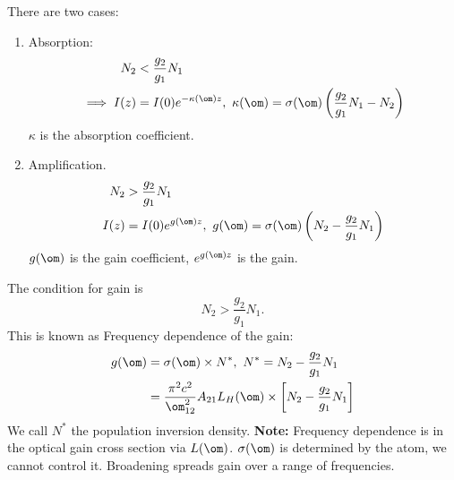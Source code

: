 \documentclass[a4paper, 11pt, normalem]{report}
\begin{document}
There are two cases:
\begin{enumerate}
    \item Absorption:
        \begin{align}
            N_2 &< \frac{g_2}{g_1}N_1 \\
            \implies I(z) &= I(0)e^{-\kappa(\om)z},~ \kappa(\om) = \sigma(\om)\left(\frac{g_2}{g_1}N_1 - N_2\right)
        \end{align}
        $\kappa$ is the absorption coefficient.
        \begin{figure}[H]
            \centering
        \end{figure}
    \item Amplification.
        \begin{align}
            N_2 &> \frac{g_2}{g_1}N_1 \\
            I(z) &= I(0)e^{g(\om)z},~ g(\om) = \sigma(\om)\left(N_2-\frac{g_2}{g_1}N_1\right)
        \end{align}
        $g(\om)$ is the gain coefficient, $e^{g(\om)z}$ is the gain.
        \begin{figure}[H]
            \centering
        \end{figure}
\end{enumerate}
The condition for gain is
\begin{equation}
    N_2 > \frac{g_2}{g_1}N_1.
\end{equation}
This is known as 
Frequency dependence of the gain:
\begin{align}
    g(\om) &= \sigma(\om)\times N^*, ~ N^* = N_2 - \frac{g_2}{g_1}N_1 \\
           &= \frac{\pi^2c^2}{\om_{12}^2}A_{21}L_H(\om)\times \left[N_2-\frac{g_2}{g_1}N_1\right]
\end{align}
We call $N^*$ the population inversion density.
\textbf{Note:} Frequency dependence is in the optical gain cross section via $L(\om)$.
$\sigma(\om)$ is determined by the atom, we cannot control it.
Broadening spreads gain over a range of frequencies.
\end{document}
